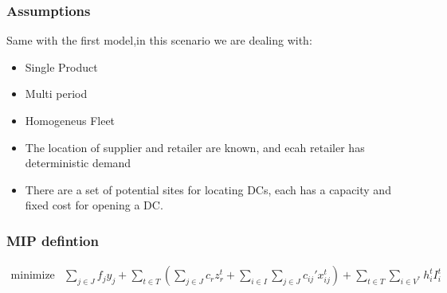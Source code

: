 \documentclass[12pt, a4paper]{article}
\begin{document}
\subsubsection{Assumptions}
Same with the first model,in this scenario we are dealing with:
\begin{itemize}
	\item Single Product
	\item Multi period
	\item Homogeneus Fleet
	\item The location of supplier and retailer are known, and ecah retailer has deterministic demand
	\item There are a set of potential sites for locating DCs, each has a capacity and fixed cost for opening a DC. 
\end{itemize}
\subsubsection{MIP defintion}
\begin{align}
\text{minimize} &\sum_{j\in J} f_j y_j  +\sum_{t\in T} \left( \sum_{j\in J} c_r z_r^t + \sum_{i\in I} \sum_{j\in J} c_{ij}' x^t_{ij}\right) +\sum_{t\in T}\sum_{i\in V^*} h^t_i I_i^t\label{objfunct2}
\end{align}
\end{document}
